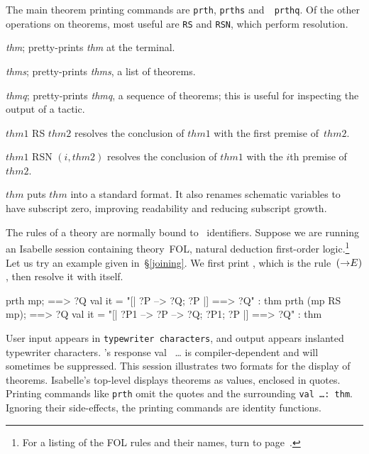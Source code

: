 The main theorem printing commands are \texttt{prth}, \texttt{prths} and~{\tt
  prthq}.  Of the other operations on theorems, most useful are \texttt{RS}
and \texttt{RSN}, which perform resolution.

\begin{ttdescription}
\item[\ttindex{prth} {\it thm};]
  pretty-prints {\it thm\/} at the terminal.

\item[\ttindex{prths} {\it thms};]
  pretty-prints {\it thms}, a list of theorems.

\item[\ttindex{prthq} {\it thmq};]
  pretty-prints {\it thmq}, a sequence of theorems; this is useful for
  inspecting the output of a tactic.

\item[$thm1$ RS $thm2$]  
  resolves the conclusion of $thm1$ with the first premise of~$thm2$.

\item[$thm1$ RSN $(i,thm2)$]  
  resolves the conclusion of $thm1$ with the $i$th premise of~$thm2$.

\item[\ttindex{standard} $thm$]  
  puts $thm$ into a standard format.  It also renames schematic variables
  to have subscript zero, improving readability and reducing subscript
  growth.
\end{ttdescription}
The rules of a theory are normally bound to \ML\ identifiers.  Suppose we are
running an Isabelle session containing theory~FOL, natural deduction
first-order logic.\footnote{For a listing of the FOL rules and their \ML{}
  names, turn to
%
           {page~\pageref{fol-rules}}.}
Let us try an example given in~\S\ref{joining}.  We
first print , which is the rule~$({\rightarrow}E)$, then resolve it with
itself.
\begin{ttbox} 
prth mp; 
{\out [| ?P --> ?Q; ?P |] ==> ?Q}
{\out val it = "[| ?P --> ?Q; ?P |] ==> ?Q" : thm}
prth (mp RS mp);
{\out [| ?P1 --> ?P --> ?Q; ?P1; ?P |] ==> ?Q}
{\out val it = "[| ?P1 --> ?P --> ?Q; ?P1; ?P |] ==> ?Q" : thm}
\end{ttbox}
User input appears in {\footnotesize\tt typewriter characters}, and output
appears in{\out slanted typewriter characters}.  \ML's response {\out val
  }~\ldots{} is compiler-dependent and will sometimes be suppressed.  This
session illustrates two formats for the display of theorems.  Isabelle's
top-level displays theorems as \ML{} values, enclosed in quotes.  Printing
commands like \texttt{prth} omit the quotes and the surrounding \texttt{val
  \ldots :\ thm}.  Ignoring their side-effects, the printing commands are 
identity functions.

